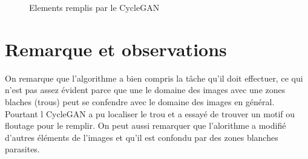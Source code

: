 \begin{figure}[H]
    \centering
    \qquad
    \caption{Elements remplis par le CycleGAN}%
    \label{fig:example}%
\end{figure}

\section{Remarque et observations}
On remarque que l'algorithme a bien compris la tâche qu'il doit effectuer, ce qui n'est pas assez évident parce que une le domaine des images avec une zones blaches (trous) peut se confendre avec le domaine des images en général. Pourtant l CycleGAN a pu localiser le trou et a essayé de trouver un motif ou floutage pour le remplir.
On peut aussi remarquer que l'alorithme a modifié d'autres éléments de l'images et qu'il est confondu par des zones blanches parasites.


